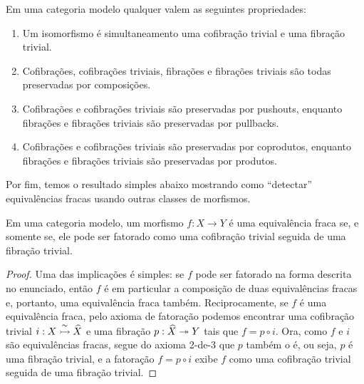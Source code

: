 \begin{corol}\label{corol:propriedades_de_preservacao_categoria_modelo}
  Em uma categoria modelo qualquer valem as seguintes propriedades:
  \begin{enumerate}
  \item Um isomorfismo é simultaneamento uma cofibração trivial e uma fibração trivial.
    
  \item Cofibrações, cofibrações triviais, fibrações e fibrações triviais são todas preservadas por composições.
    
  \item Cofibrações e cofibrações triviais são preservadas por pushouts, enquanto fibrações e fibrações triviais são preservadas por pullbacks.
    
  \item Cofibrações e cofibrações triviais são preservadas por coprodutos, enquanto fibrações e fibrações triviais são preservadas por produtos.
  \end{enumerate}
\end{corol}

Por fim, temos o resultado simples abaixo mostrando como ``detectar'' equivalências fracas usando outras classes de morfismos.

\begin{lema}\label{lema:detectando_equivalencia_fraca}
  Em uma categoria modelo, um morfismo $f: X \to Y$ é uma equivalência fraca se, e somente se, ele pode ser fatorado como uma cofibração trivial seguida de uma fibração trivial.
\end{lema}

\begin{proof}
  Uma das implicações é simples: se $f$ pode ser fatorado na forma descrita no enunciado, então $f$ é em particular a composição de duas equivalências fracas e, portanto, uma equivalência fraca também.
  Reciprocamente, se $f$ é uma equivalência fraca, pelo axioma de fatoração podemos encontrar uma cofibração trivial $i: X \overset{\sim}{\rightarrowtail} \widehat{X}$ e uma fibração $p: \widehat{X} \twoheadrightarrow Y$ tais que $f = p \circ i$.
  Ora, como $f$ e $i$ são equivalências fracas, segue do axioma 2-de-3 que $p$ também o é, ou seja, $p$ é uma fibração trivial, e a fatoração $f = p \circ i$ exibe $f$ como uma cofibração trivial seguida de uma fibração trivial.
\end{proof}



